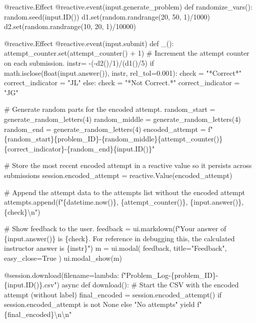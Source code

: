 \documentclass[
  letterpaper,
  DIV=11,
  numbers=noendperiod]{scrreprt}
\newenvironment{Shaded}{\begin{snugshade}}{\end{snugshade}}
\newcommand{\NormalTok}[1]{\textcolor[rgb]{0.00,0.23,0.31}{#1}}
\begin{document}
\begin{Shaded}
\begin{Highlighting}[]
\NormalTok{    @reactive.Effect}
\NormalTok{    @reactive.event(input.generate\_problem)}
\NormalTok{    def randomize\_vars():}
\NormalTok{        random.seed(input.ID())}
\NormalTok{        d1.set(random.randrange(20, 50, 1)/1000)}
\NormalTok{        d2.set(random.randrange(10, 20, 1)/10000)}
        
\NormalTok{    @reactive.Effect}
\NormalTok{    @reactive.event(input.submit)}
\NormalTok{    def \_():}
\NormalTok{        attempt\_counter.set(attempt\_counter() + 1)  \# Increment the attempt counter on each submission.}
\NormalTok{        instr= {-}({-}d2()/1)/(d1()/5)}
\NormalTok{        if math.isclose(float(input.answer()), instr, rel\_tol=0.001):}
\NormalTok{            check = "*Correct*"}
\NormalTok{            correct\_indicator = "JL"}
\NormalTok{        else:}
\NormalTok{            check = "*Not Correct.*"}
\NormalTok{            correct\_indicator = "JG"}

\NormalTok{        \# Generate random parts for the encoded attempt.}
\NormalTok{        random\_start = generate\_random\_letters(4)}
\NormalTok{        random\_middle = generate\_random\_letters(4)}
\NormalTok{        random\_end = generate\_random\_letters(4)}
\NormalTok{        encoded\_attempt = f"\{random\_start\}\{problem\_ID\}{-}\{random\_middle\}\{attempt\_counter()\}\{correct\_indicator\}{-}\{random\_end\}\{input.ID()\}"}

\NormalTok{        \# Store the most recent encoded attempt in a reactive value so it persists across submissions}
\NormalTok{        session.encoded\_attempt = reactive.Value(encoded\_attempt)}

\NormalTok{        \# Append the attempt data to the attempts list without the encoded attempt}
\NormalTok{        attempts.append(f"\{datetime.now()\}, \{attempt\_counter()\}, \{input.answer()\}, \{check\}\textbackslash{}n")}

\NormalTok{        \# Show feedback to the user.}
\NormalTok{        feedback = ui.markdown(f"Your answer of \{input.answer()\} is \{check\}. For reference in debugging this, the calculated instructor answer is \{instr\}")}
\NormalTok{        m = ui.modal(}
\NormalTok{            feedback,}
\NormalTok{            title="Feedback",}
\NormalTok{            easy\_close=True}
\NormalTok{        )}
\NormalTok{        ui.modal\_show(m)}

\NormalTok{    @session.download(filename=lambda: f"Problem\_Log{-}\{problem\_ID\}{-}\{input.ID()\}.csv")}
\NormalTok{    async def download():}
\NormalTok{        \# Start the CSV with the encoded attempt (without label)}
\NormalTok{        final\_encoded = session.encoded\_attempt() if session.encoded\_attempt is not None else "No attempts"}
\NormalTok{        yield f"\{final\_encoded\}\textbackslash{}n\textbackslash{}n"}
        

\end{Highlighting}
\end{Shaded}
\end{document}
